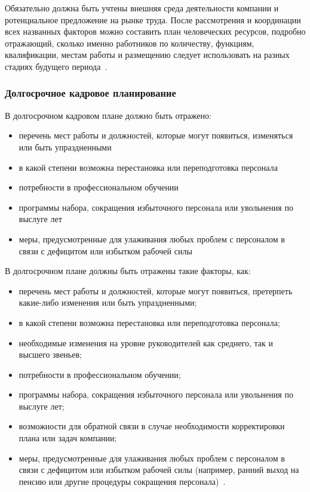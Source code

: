 \documentclass{../industrial-development}
\begin{document}
\lecturenotes

Обязательно должна быть учтены внешняя среда деятельности компании и ротенциальное предложение на рынке труда. После рассмотрения и координации всех названных факторов можно составить план человеческих ресурсов, подробно отражающий, сколько именно работников по количеству, функциям, квалификации, местам работы и размещению следует использовать на разных стадиях будущего периода~\cite[с.~86]{Ivanova}.

\begin{frame} \frametitle{Долгосрочное кадровое планирование}

 В долгосрочном кадровом плане должно быть отражено:
  \begin{itemize}
  \item	перечень мест работы и должностей, которые могут появиться, изменяться или быть упраздненными
  \item	в какой степени возможна перестановка или переподготовка персонала
  \item	потребности в профессиональном обучении
  \item	программы набора, сокращения избыточного персонала или увольнения по выслуге лет
   \item меры, предусмотренные для улаживания любых проблем с персоналом в связи с дефицитом или избытком рабочей силы 
	  \end{itemize}
\end{frame}

\lecturenotes

В долгосрочном плане должны быть отражены такие факторы, как:
 \begin{itemize}
\item перечень мест работы и должностей, которые могут появиться, претерпеть какие-либо изменения или быть упраздненными;

\item в какой степени возможна перестановка или переподготовка персонала;

\item необходимые изменения на уровне руководителей как среднего, так и высшего звеньев;

\item потребности в профессиональном обучении;

\item программы набора, сокращения избыточного персонала или увольнения по выслуге лет;

\item возможности для обратной связи в случае необходимости корректировки плана или задач компании;

\item меры, предусмотренные для улаживания любых проблем с персоналом в связи с дефицитом или избытком рабочей силы (например, ранний выход на пенсию или другие процедуры сокращения персонала)~\cite[с.~86--87]{Ivanova}.
  \end{itemize}
\end{document}
